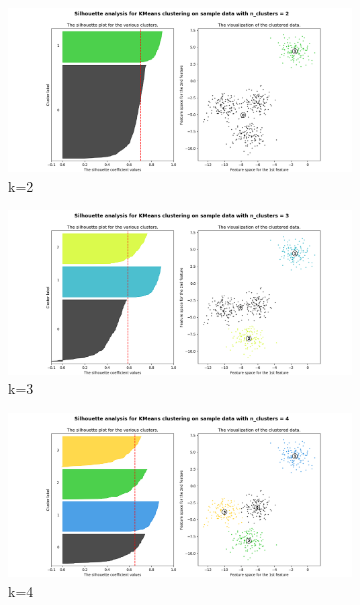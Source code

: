\documentclass[bachelor,adobefonts]{jnuthesis}
\begin{document}
\begin{figure}[h!]
  \centering
  \begin{subfigure}[b]{0.4\linewidth}
    \includegraphics[width=\linewidth]{Wksh-2.png}
    \caption{k=2}
  \end{subfigure}
  \begin{subfigure}[b]{0.4\linewidth}
    \includegraphics[width=\linewidth]{Wksh-3.png}
    \caption{k=3}
  \end{subfigure}
  \begin{subfigure}[b]{0.4\linewidth}
    \includegraphics[width=\linewidth]{Wksh-4.png}
    \caption{k=4}
  \end{subfigure}
  \begin{subfigure}[b]{0.4\linewidth}

\end{subfigure}
\end{figure}
\end{document}
